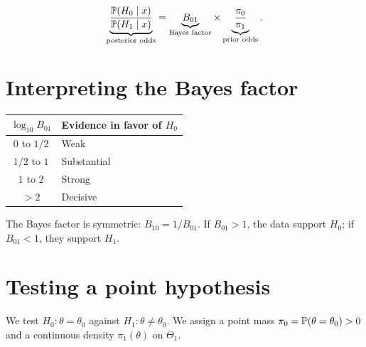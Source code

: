 \begin{keyformulas}[title=\textbf{Posterior odds ratio}]
\[
  \underbrace{\frac{\mathbb{P}(H_0 \mid x)}{\mathbb{P}(H_1 \mid x)}}_{\text{posterior odds}}
  = \underbrace{B_{01}}_{\text{Bayes factor}}
  \times
  \underbrace{\frac{\pi_0}{\pi_1}}_{\text{prior odds}}.
\]
\end{keyformulas}

\section{Interpreting the Bayes factor}

\begin{keyformulas}[title=\textbf{Jeffreys' scale for $B_{01}$}]
\begin{center}
\renewcommand{\arraystretch}{1.3}
\begin{tabular}{cl}
\toprule
$\log_{10} B_{01}$ & \textbf{Evidence in favor of $H_0$} \\
\midrule
$0$ to $1/2$ & Weak \\
$1/2$ to $1$ & Substantial \\
$1$ to $2$ & Strong \\
$> 2$ & Decisive \\
\bottomrule
\end{tabular}
\end{center}
\end{keyformulas}

\begin{remark}
The Bayes factor is symmetric: $B_{10} = 1/B_{01}$. If $B_{01} > 1$,
the data support $H_0$; if $B_{01} < 1$, they support $H_1$.
\end{remark}

\section{Testing a point hypothesis}

\begin{definition}
We test $H_0 : \theta = \theta_0$ against
$H_1 : \theta \neq \theta_0$. We assign a point mass
$\pi_0 = \mathbb{P}(\theta = \theta_0) > 0$ and a continuous density
$\pi_1(\theta)$ on $\Theta_1$.
\end{definition}

